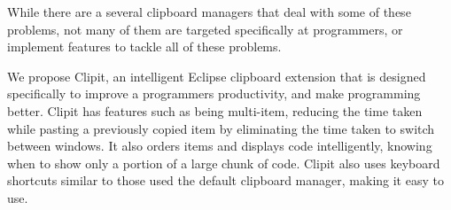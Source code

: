 \documentclass{acm_proc_article-sp}
\begin{document}
While there are a several clipboard managers that deal with some of these problems, not many of them are targeted specifically at programmers, or implement features to tackle all of these problems.

We propose Clipit, an intelligent Eclipse clipboard extension that is designed specifically to improve a programmers productivity, and make programming better. Clipit has features such as being multi-item, reducing the time taken while pasting a previously copied item by eliminating the time taken to switch between windows. It also orders items and displays code intelligently, knowing when to show only a portion of a large chunk of code. Clipit also uses keyboard shortcuts similar to those used the default clipboard manager, making it easy to use. 




\end{document}
